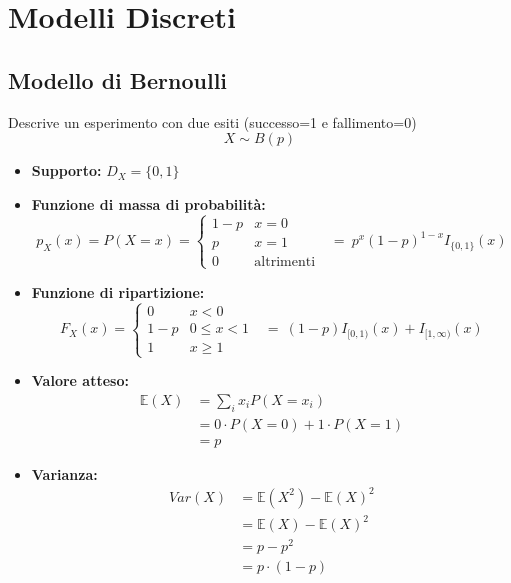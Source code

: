 \documentclass[11pt]{report}
\begin{document}
\chapter{Modelli Discreti}

\section{Modello di Bernoulli}
Descrive un esperimento con due esiti (successo=1 e fallimento=0)
\begin{equation}
    X\sim B(p)
\end{equation}
\begin{itemize}
	\item \textbf{Supporto:} $D_X=\{0,1\}$
    \item \textbf{Funzione di massa di probabilità:}
    \begin{equation}
		p_X(x) = P(X = x) =
      	\begin{cases}
			1-p   		& x=0\\
        	p 			& x=1\\
        	0			& \text{altrimenti}
      	\end{cases}
      	\ \ \ =\ p^x(1-p)^{1-x} I_{\{0,1\}}(x)
    \end{equation}
    \item \textbf{Funzione di ripartizione:}
    \begin{equation}
    	F_X(x) =
        \begin{cases}
        	0   		& x<0\\
          	1-p 		& 0\leq x<1\\
          	1   		& x\geq1
        \end{cases}
        \ \ \ =\ (1-p) I_{[0,1)}(x) + I_{[1,\infty)}(x)
	\end{equation}
    \item \textbf{Valore atteso:}
    \begin{equation}
        \begin{split}
            \mathbb{E}(X) & = \sum_i x_i P(X=x_i)\\
            & = 0 \cdot P(X=0) + 1 \cdot P(X=1)\\
            & = p
        \end{split}
    \end{equation}
    \item \textbf{Varianza:}
    \begin{equation}
    	\begin{split}
   			Var(X) & = \mathbb{E}(X^2) - \mathbb{E}(X)^2\\
   			& = \mathbb{E}(X) - \mathbb{E}(X)^2\\
   			& = p - p^2\\
   			& = p \cdot (1 - p)
		\end{split}
    \end{equation}
\end{itemize}
\end{document}

